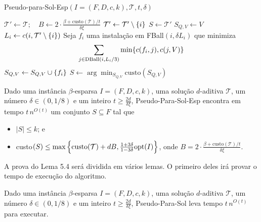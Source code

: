 \begin{algorithm}
    \caption{\sc Pseudo-para-Sol-Esp$(I = (F,D,c,k), \mathcal{T}, t, \delta)$}
    \begin{algorithmic}[1]
        \State $\mathcal{T}' \gets \mathcal{T}; \quad B \gets 2 \cdot \frac{\beta + \text{custo}(\mathcal{T})/t}{\delta\xi}$
        \State $\mathcal{T}' \gets \mathcal{T}' \setminus \{i\}$
        \EndWhile
        \State \Return $S \gets \mathcal{T}'$
        \EndIf
            \State $S_{Q,V} \gets V$
                \State $L_i \gets c(i,\mathcal{T}' \setminus \{i\})$
                \State Seja $f_i$ uma instalação em FBall$(i, \delta L_i)$ que minimiza \[\sum_{j \in \text{DBall}(i,L_i/3)} \min\{c(f_i,j),c(j,V)\}\]
                \State $S_{Q,V} \gets S_{Q,V} \cup \{f_i\}$
            \EndFor
        \EndFor
        \State \Return $S \gets \arg\min_{S_{Q,V}} \text{custo}(S_{Q,V})$
    \end{algorithmic}
\end{algorithm}

\begin{lemma}
    Dado uma instância $\beta$-esparsa $I = (F,D,c,k)$, uma solução $d$-aditiva $\mathcal{T}$, um número $\delta \in (0,1/8)$ e um inteiro $t \geq \frac{2d}{\delta \xi}$, {\sc Pseudo-Para-Sol-Esp} encontra em tempo $t\, n^{O(t)}$ um conjunto $S \subseteq F$ tal que 
    \begin{itemize}
        \item $|S| \leq k$; e
        \item custo$(S) \leq \max \left\{ \text{custo}(\mathcal{T}) + dB, \frac{1+3\delta}{1-3\delta} \mathrm{opt}(I)\right\}$, onde $B = 2 \cdot \frac{\beta + \text{custo}(\mathcal{T})/t}{\delta\xi}$.
    \end{itemize}
\end{lemma}

A prova do Lema 5.4 será dividida em vários lemas. O primeiro deles irá provar o tempo de execução do algoritmo.

\begin{lemma}
    Dado uma instância $\beta$-esparsa $I = (F,D,c,k)$, uma solução $d$-aditiva $\mathcal{T}$, um número $\delta \in (0,1/8)$ e um inteiro $t \geq \frac{2d}{\delta \xi}$, {\sc Pseudo-Para-Sol} leva tempo $t\, n^{O(t)}$ para executar.
\end{lemma}

